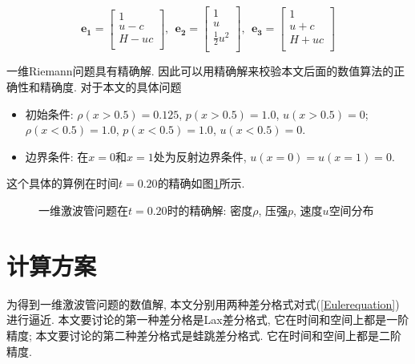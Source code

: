 \documentclass[a4paper,boxed]{caspset}
\begin{document}
\[
\mathbf{e_1} = \left[
                 \begin{array}{c}
                   1 \\
                   u-c \\
                   H-uc \\
                 \end{array}
               \right], \:\:
\mathbf{e_2} = \left[
                 \begin{array}{c}
                   1 \\
                   u \\
                   \frac{1}{2}u^2 \\
                 \end{array}
               \right], \:\:
\mathbf{e_3} = \left[
                 \begin{array}{c}
                   1 \\
                   u+c \\
                   H+uc \\
                 \end{array}
               \right]
\]

一维Riemann问题具有精确解. 因此可以用精确解来校验本文后面的数值算法的正确性和精确度.
对于本文的具体问题
\begin{itemize}
\item 初始条件: $\rho(x>0.5) = 0.125$, $p(x>0.5) = 1.0$, $u(x>0.5) = 0$;
  $\rho(x<0.5) = 1.0$, $p(x<0.5) = 1.0$, $u(x<0.5) = 0$.
\item 边界条件: 在$x=0$和$x=1$处为反射边界条件, $u(x=0)=u(x=1)=0$.
\end{itemize}
这个具体的算例在时间$t=0.20$的精确如图\ref{exact}所示.
\begin{figure}[!htb]
\centering

\caption{\label{exact}一维激波管问题在$t=0.20$时的精确解: 密度$\rho$, 压强$p$, 速度$u$空间分布}
\end{figure}

\section{计算方案}
为得到一维激波管问题的数值解, 本文分别用两种差分格式对式(\ref{Eulerequation})进行逼近. 本文要讨论的第一种差分格是Lax差分格式, 它在时间和空间上都是一阶精度; 本文要讨论的第二种差分格式是蛙跳差分格式. 它在时间和空间上都是二阶精度.
\end{document}
